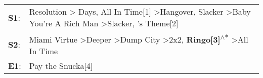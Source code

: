 \begin{supertabular}{p{0.03\textwidth}p{0.92\textwidth}}
 \textbf{S1}:  &  Resolution\textsuperscript{} \textgreater {} Days\textsuperscript{}, \enspace All In Time[1]\textsuperscript{} \textgreater \enspace Hangover\textsuperscript{}, \enspace Slacker\textsuperscript{} \textgreater \enspace Baby You're A Rich Man\textsuperscript{} \textgreater \enspace Slacker\textsuperscript{}, 's Theme[2]\textsuperscript{}  \enspace  \\
 \textbf{S2}:  &                                                                                 Miami Virtue\textsuperscript{} \textgreater \enspace Deeper\textsuperscript{} \textgreater \enspace Dump City\textsuperscript{} \textgreater \enspace 2x2\textsuperscript{}, \enspace \textbf{Ringo[3]\textsuperscript{$\wedge$*}} \textgreater \enspace All In Time\textsuperscript{}  \enspace  \\
 \textbf{E1}:  &                                                                                                                                                                                                                                                                                                                                    Pay the Snucka[4]\textsuperscript{}  \enspace  \\
\end{supertabular}
